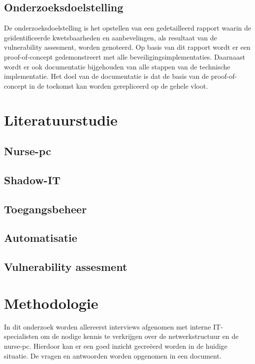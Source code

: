 \subsection{Onderzoeksdoelstelling}
De onderzoeksdoelstelling is het opstellen van een gedetailleerd rapport waarin de geïdentificeerde kwetsbaarheden en aanbevelingen, als resultaat van de vulnerability assesment, worden genoteerd.
Op basis van dit rapport wordt er een proof-of-concept gedemonstreert met alle beveiligingsimplementaties.
Daarnaast wordt er ook documentatie bijgehouden van alle stappen van de technische implementatie.
Het doel van de documentatie is dat de basis van de proof-of-concept in de toekomst kan worden gerepliceerd op de gehele vloot.


\section{Literatuurstudie}%
\label{sec:literatuurstudie}
\subsection{Nurse-pc}
\subsection{Shadow-IT}
\subsection{Toegangsbeheer}
\subsection{Automatisatie}
\subsection{Vulnerability assesment}



\section{Methodologie}%
\label{sec:methodologie}
In dit onderzoek worden allereerst interviews afgenomen met interne IT-specialisten om de nodige kennis te verkrijgen over de netwerkstructuur en de nurse-pc. 
Hierdoor kan er een goed inzicht gecreëerd worden in de huidige situatie. De vragen en antwoorden worden opgenomen in een document.

